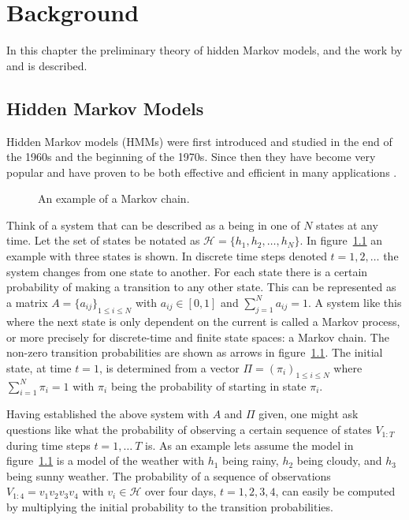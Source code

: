 
\chapter{Background}
\label{cha:background}

In this chapter the preliminary theory of hidden Markov models, and
the work by \citet{lifshits2009speeding} and \citet{sand2013ziphmmlib} is
described.

\section{Hidden Markov Models}
\label{sec:hidden-markov-models}

Hidden Markov models (HMMs) were first introduced and
studied in the end of the 1960s and the beginning of the 1970s. Since then they
have become very popular and have proven to be both effective and efficient in
many applications \citep{rabiner1989tutorial}.

\begin{figure}
  \centering
  
  \caption{An example of a Markov chain.}
  \label{fig:markov-chain}
\end{figure}

Think of a system that can be described as a being in one of $N$ states at any
time. Let the set of states be notated as $\mathcal{H} = \{h_1, h_2, \dots, h_N\}$.
In figure~\ref{fig:markov-chain} an example with three states is shown. In
discrete time steps denoted $t = 1, 2, \dots$ the system changes from one state
to another. For each state there is a certain probability
of making a transition to any other state. This can be represented as a matrix
$A = {\{a_{ij}\}}_{1 \le i \le N}$ with $a_{ij} \in [0, 1]$ and
$\sum_{j = 1}^N a_{ij} = 1$. A system like this where the next state is only
dependent on the current is called a Markov process, or more precisely
for discrete-time and finite state spaces: a Markov chain. The non-zero
transition probabilities are shown as arrows in
figure~\ref{fig:markov-chain}. The initial state, at time $t = 1$, is
determined from a vector $\Pi = {(\pi_i)}_{1 \le i \le N}$ where
$\sum_{i=1}^N \pi_i = 1$ with $\pi_i$ being the probability of starting in
state $\pi_i$.

Having established the above system with $A$ and $\Pi$ given, one might ask
questions like what the probability of observing a certain sequence of states
$V_{1:T}$ during time steps $t = 1, \dots\ T$ is. As an example lets assume the
model in figure~\ref{fig:markov-chain} is a model of the weather with $h_1$
being rainy, $h_2$ being cloudy, and $h_3$ being sunny weather. The probability
of a sequence of observations $V_{1:4} = v_1v_2v_3v_4$ with
$v_i \in \mathcal{H}$ over four days, $t = 1, 2, 3, 4$, can easily be computed
by multiplying the initial probability to the transition probabilities.

